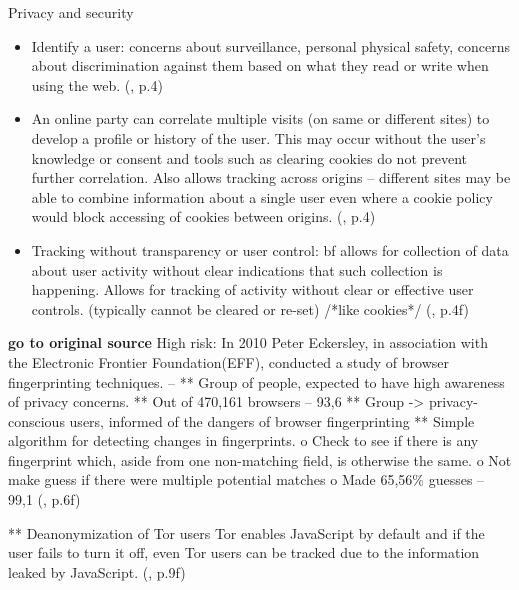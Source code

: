 Privacy and security

\begin{itemize}
	\item Identify a user: concerns about surveillance, personal physical safety, concerns about discrimination against them based on what they read or write when using the web. (\textcite{doty18}, p.4)
	\item An online party can correlate multiple visits (on same or different sites) to develop a profile or history of the user. This may occur without the user’s knowledge or consent and tools such as clearing cookies do not prevent further correlation. Also allows tracking across origins – different sites may be able to combine information about a single user even where a cookie policy would block accessing of cookies between origins. (\textcite{doty18}, p.4)
	\item Tracking without transparency or user control: bf allows for collection of data about user activity without clear indications that such collection is happening. Allows for tracking of activity without clear or effective user controls. (typically cannot be cleared or re-set) /*like cookies*/ (\textcite{doty18}, p.4f)
\end{itemize}

\textbf{go to original source}
High risk: 
In 2010 Peter Eckersley, in association with the Electronic Frontier Foundation(EFF), conducted a study of browser fingerprinting techniques. –
**	Group of people, expected to have high awareness of privacy concerns. 
**	Out of 470,161 browsers – 93,6%
**	Group -> privacy-conscious users, informed of the dangers of browser fingerprinting
**	Simple algorithm for detecting changes in fingerprints.
o	Check to see if there is any fingerprint which, aside from one non-matching field, is otherwise the same.
o	Not make guess if there were multiple potential matches
o	Made 65,56\% guesses – 99,1%
(\textcite{havens16}, p.6f)

**	Deanonymization of Tor users
Tor enables JavaScript by default and if the user fails to turn it off, even Tor users can be tracked due to the information leaked by JavaScript. (\textcite{havens16}, p.9f)

